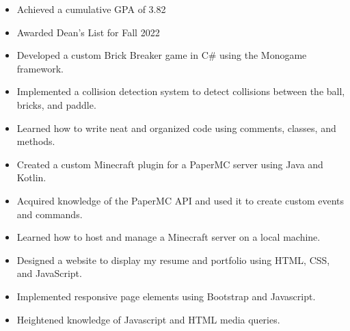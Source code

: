 \documentclass[10pt,a4paper,ragged2e,withhyper]{altacv}
\begin{document}


\makecvheader


\begin{paracol}{2}

\begin{itemize}
  \item Achieved a cumulative GPA of 3.82
  \item Awarded Dean's List for Fall 2022
\end{itemize}


\begin{itemize}
  \item Developed a custom Brick Breaker game in C\# using the Monogame framework.
  \item Implemented a collision detection system to detect collisions between the ball, bricks, and paddle.
  \item Learned how to write neat and organized code using comments, classes, and methods.
\end{itemize}

\divider

\begin{itemize}
  \item Created a custom Minecraft plugin for a PaperMC server using Java and Kotlin.
  \item Acquired knowledge of the PaperMC API and used it to create custom events and commands.
  \item Learned how to host and manage a Minecraft server on a local machine.
\end{itemize}

\divider

\begin{itemize}
  \item Designed a website to display my resume and portfolio using HTML, CSS, and JavaScript.
  \item Implemented responsive page elements using Bootstrap and Javascript.
  \item Heightened knowledge of Javascript and HTML media queries.
\end{itemize}


\end{paracol}
\end{document}
